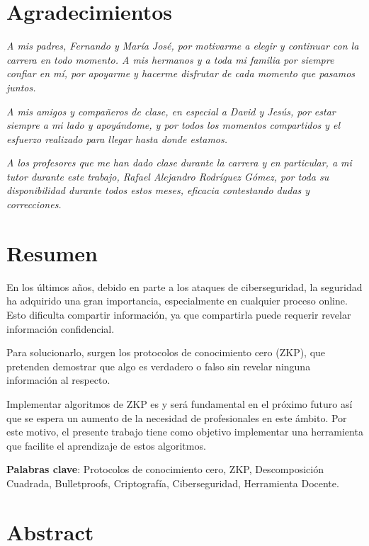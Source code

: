 \chapter*{Agradecimientos}

\begin{flushleft}
    \textit{A mis padres, Fernando y María José, por motivarme a elegir y continuar con la carrera en todo momento. A mis hermanos y a toda mi familia por siempre confiar en mí, por apoyarme y hacerme disfrutar de cada momento que pasamos juntos.}

    \textit{A mis amigos y compañeros de clase, en especial a David y Jesús, por estar siempre a mi lado y apoyándome, y por todos los momentos compartidos y el esfuerzo realizado para llegar hasta donde estamos.}

    \textit{A los profesores que me han dado clase durante la carrera y en particular, a mi tutor durante este trabajo, Rafael Alejandro Rodríguez Gómez, por toda su disponibilidad durante todos estos meses, eficacia contestando dudas y correcciones.}
\end{flushleft}

\blankpage

\chapter*{Resumen}

En los últimos años, debido en parte a los ataques de ciberseguridad, la seguridad ha adquirido una gran importancia, especialmente en cualquier proceso online. Esto dificulta compartir información, ya que compartirla puede requerir revelar información confidencial.

Para solucionarlo, surgen los protocolos de conocimiento cero (ZKP), que pretenden demostrar que algo es verdadero o falso sin revelar ninguna información al respecto.

Implementar algoritmos de ZKP es y será fundamental en el próximo futuro así que se espera un aumento de la necesidad de profesionales en este ámbito. Por este motivo, el presente trabajo tiene como objetivo implementar una herramienta que facilite el aprendizaje de estos algoritmos.

\vfill

\textbf{Palabras clave}: Protocolos de conocimiento cero, ZKP, Descomposición Cuadrada, Bulletproofs, Criptografía, Ciberseguridad, Herramienta Docente.

\blankpage

\chapter*{Abstract}

